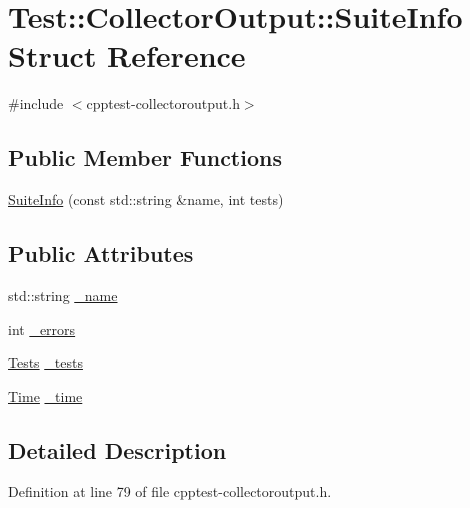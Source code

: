 \hypertarget{struct_test_1_1_collector_output_1_1_suite_info}{}\section{Test\+:\+:Collector\+Output\+:\+:Suite\+Info Struct Reference}
\label{struct_test_1_1_collector_output_1_1_suite_info}


{\ttfamily \#include $<$cpptest-\/collectoroutput.\+h$>$}

\subsection*{Public Member Functions}
\begin{DoxyCompactItemize}
\item 
\mbox{\hyperlink{struct_test_1_1_collector_output_1_1_suite_info_a293cc820c5745fc786faf3b8e2ab9438}{Suite\+Info}} (const std\+::string \&name, int tests)
\end{DoxyCompactItemize}
\subsection*{Public Attributes}
\begin{DoxyCompactItemize}
\item 
std\+::string \mbox{\hyperlink{struct_test_1_1_collector_output_1_1_suite_info_a55bdc93b43037cba310bfd69441a3f15}{\+\_\+name}}
\item 
int \mbox{\hyperlink{struct_test_1_1_collector_output_1_1_suite_info_aad064ab88ce0e898be5b01ae98898e0f}{\+\_\+errors}}
\item 
\mbox{\hyperlink{class_test_1_1_collector_output_a54a7b7c9b6d181102bc8934190b06e86}{Tests}} \mbox{\hyperlink{struct_test_1_1_collector_output_1_1_suite_info_aeffb563714b2ba368e8c9cc92cb78091}{\+\_\+tests}}
\item 
\mbox{\hyperlink{class_test_1_1_time}{Time}} \mbox{\hyperlink{struct_test_1_1_collector_output_1_1_suite_info_a50173eba0cbf1c9e77bb029809a4580e}{\+\_\+time}}
\end{DoxyCompactItemize}


\subsection{Detailed Description}


Definition at line 79 of file cpptest-\/collectoroutput.\+h.




